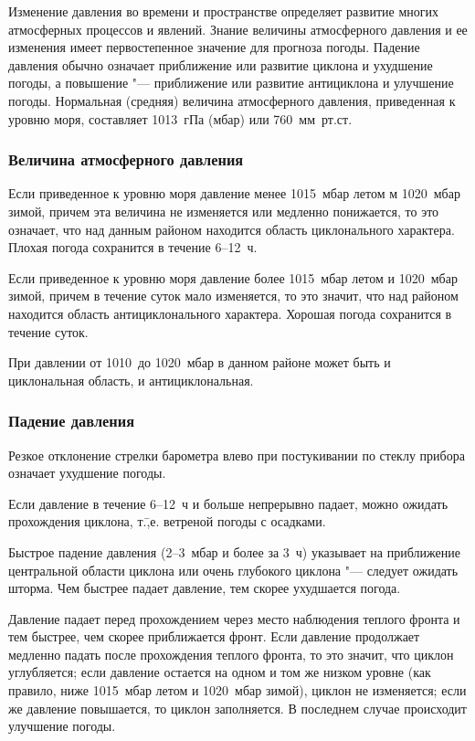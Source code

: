 Изменение давления во времени и пространстве определяет развитие
многих атмосферных процессов и явлений. Знание величины атмосферного
давления и ее изменения имеет первостепенное значение для прогноза
погоды. Падение давления обычно означает приближение или развитие
циклона и ухудшение погоды, а повышение "--- приближение или развитие
антициклона и улучшение погоды. Нормальная (средняя) величина
атмосферного давления, приведенная к уровню моря, составляет 1013~гПа
(мбар) или 760~мм~рт.ст.

\subsubsection{Величина атмосферного давления}

 Если приведенное к уровню моря давление менее 1015~мбар летом
м 1020~мбар зимой, причем эта величина не изменяется или медленно
понижается, то это означает, что над данным районом находится область
циклонального характера. Плохая погода сохранится в течение 6--12~ч.

 Если приведенное к уровню моря давление более 1015~мбар летом
и 1020~мбар зимой, причем в течение суток мало изменяется, то это
значит, что над районом находится область антициклонального
характера. Хорошая погода сохранится в течение суток.

 При давлении от 1010~до 1020~мбар в данном районе может быть и
циклональная область, и антициклональная.

\subsubsection{Падение давления}

 Резкое отклонение стрелки барометра влево при постукивании по
стеклу прибора означает ухудшение погоды.

 Если давление в течение 6--12~ч и больше непрерывно падает, можно
ожидать прохождения циклона, т.\=,е. ветреной погоды с осадками.

 Быстрое падение давления (2--3~мбар и более за 3~ч)
указывает на приближение центральной области циклона или очень
глубокого циклона "--- следует ожидать шторма. Чем быстрее падает
давление, тем скорее ухудшается погода.

 Давление падает перед прохождением через место наблюдения
теплого фронта и тем быстрее, чем скорее приближается фронт. Если
давление продолжает медленно падать после прохождения теплого фронта,
то это значит, что циклон углубляется; если давление остается на одном
и том же низком уровне (как правило, ниже 1015~мбар летом и 1020~мбар
зимой), циклон не изменяется; если же давление повышается, то циклон
заполняется. В последнем случае происходит улучшение погоды.

